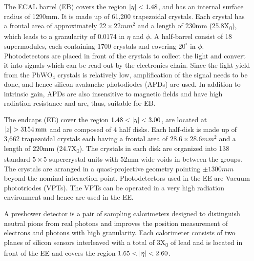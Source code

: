 The ECAL barrel (\gls{EB}) covers the region $\lvert \eta \rvert<1.48$, and has an internal surface radius of 1290\unit{mm}. It is made up of 61,200 
trapezoidal crystals. Each crystal has a frontal area of approximately $22\times22\unit{mm^{2}}$ and a length of 230\unit{mm} (25.8\unit{X_{0}}),
which leads to a granularity of 0.0174 in $\eta$ and $\phi$. A half-barrel consist of 18 supermodules, each containing 1700 crystals and covering
$20^{\circ}$ in $\phi$. Photodetectors are placed in front of the crystals to collect the light and convert it into signals which can be read out 
by the electronics chain. Since the light yield from the PbWO$_{4}$ crystals is relatively low, amplification of the signal needs to be done, and 
hence silicon avalanche photodiodes (\gls{APDs}) are used. In addition to intrinsic gain, APDs are also insensitive to magnetic fields and have high 
radiation resistance and are, thus, suitable for EB.

The endcaps (\gls{EE}) cover the region $1.48<\lvert \eta \rvert<3.00$, are located at $\lvert z \rvert>3154\mathrm{\,mm}$ and are composed of 4 half disks. Each half-disk 
is made up of 3,662 trapezoidal crystals each having a frontal area of $28.6\times28.6\unit{mm^{2}}$ and a length of 220\unit{mm} 
(24.7\unit{X_{0}}). The crystals in each disk are organized into 138 standard $5\times5$ supercrystal units with 52\unit{mm} wide voids in between 
the groups. The crystals are arranged in a quasi-projective geometry pointing $\pm1300\unit{mm}$ beyond the nominal  interaction point. 
Photodetectors used in the EE are Vacuum phototriodes (\gls{VPTs}). The VPTs can be operated in a very high radiation environment and hence are used in the EE.

A preshower detector is a pair of sampling calorimeters designed to distinguish neutral pions from real photons and improves the position
measurement of electrons and photons with high granularity. Each calorimeter consists of two planes of silicon sensors interleaved with 
a total of 3\unit{X_{0}} of lead and is located in front of the EE and covers the region $1.65<\lvert \eta \rvert<2.60$.

